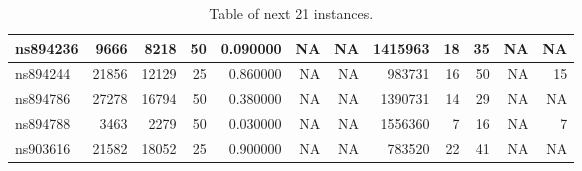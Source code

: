 \begin{sidewaystable}
\begin{tabular}{|l|r|r|r|r|r|r|r|r|r|r|r|}
ns894236 & 9666 & 8218 & 50 & 0.090000 & NA & NA & 1415963 & 18 & 35 & NA & NA\\ \hline 
ns894244 & 21856 & 12129 & 25 & 0.860000 & NA & NA & 983731 & 16 & 50 & NA & 15  \\ \hline 
ns894786 & 27278 & 16794 & 50 & 0.380000 & NA & NA & 1390731 & 14 & 29 & NA & NA\\ \hline 
ns894788 & 3463 & 2279 & 50 & 0.030000 & NA & NA & 1556360 & 7 & 16 & NA & 7\\ \hline 
ns903616 & 21582 & 18052 & 25 & 0.900000 & NA & NA & 783520 & 22 & 41 & NA & NA\\ \hline 
\end{tabular}
\caption{Table of next 21 instances.}
\label{tab3}
\end{sidewaystable}
\begin{sidewaystable}
\centering


\end{sidewaystable}
